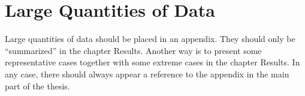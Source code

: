 \chapter{Large Quantities of Data}\label{appA}
\thispagestyle{plain}

Large quantities of data should be placed in an appendix. They should only be
``summarized'' in the chapter Results. Another way is to present
some representative cases together with some extreme cases in the chapter
Results. In any case, there should always appear a reference to the appendix in
the main part of the thesis.
